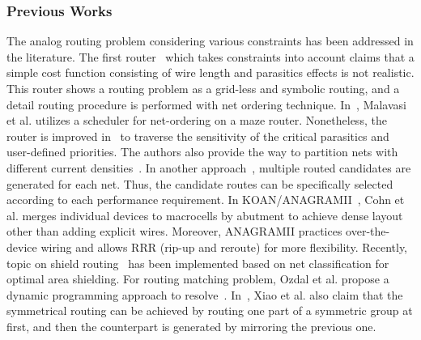       \subsubsection{Previous Works}
        The analog routing problem considering various constraints has been addressed in the literature. The first router~\cite{anrmfca-CICC1990} which takes constraints into account claims that a simple cost function consisting of wire length and parasitics effects is not realistic. This router shows a routing problem as a grid-less and symbolic routing, and a detail routing procedure is performed with net ordering technique. In~\cite{GeneralRouter-CompEuro89}, Malavasi et al. utilizes a scheduler for net-ordering on a maze router. Nonetheless, the router is improved in~\cite{sensitAR-iccad90} to traverse the sensitivity of the critical parasitics and user-defined priorities. The authors also provide the way to partition nets with different current densities~\cite{arearouting-tcad1993}. In another approach~\cite{GRforAMS-SOCC2001}, multiple routed candidates are generated for each net. Thus, the candidate routes can be specifically selected according to each performance requirement. In KOAN/ANAGRAMII~\cite{KOAN_ANAGRAMII-JSSC1991}, Cohn et al. merges individual devices to macrocells by abutment to achieve dense layout other than adding explicit wires. Moreover, ANAGRAMII practices over-the-device wiring and allows RRR (rip-up and reroute) for more flexibility. Recently, topic on shield routing~\cite{shieldRouting-islped2010} has been implemented based on net classification for optimal area shielding. For routing matching problem, Ozdal et al. propose a dynamic programming approach to resolve~\cite{AnalogRouteMatching-iccad2009}. In~\cite{LinfuXiao-iccad2010}, Xiao et al. also claim that the symmetrical routing can be achieved by routing one part of a symmetric group at first, and then the counterpart is generated by mirroring the previous one.
        
